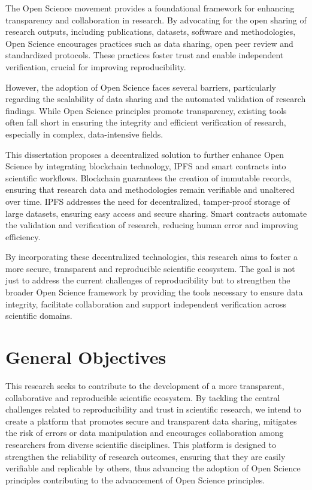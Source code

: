 \documentclass{article}
\begin{document}
The Open Science movement provides a foundational framework for enhancing transparency and collaboration in research. By advocating for the open sharing of research outputs, including publications, datasets, software and methodologies, Open Science encourages practices such as data sharing, open peer review and standardized protocols. These practices foster trust and enable independent verification, crucial for improving reproducibility.

However, the adoption of Open Science faces several barriers, particularly regarding the scalability of data sharing and the automated validation of research findings. While Open Science principles promote transparency, existing tools often fall short in ensuring the integrity and efficient verification of research, especially in complex, data-intensive fields.

This dissertation proposes a decentralized solution to further enhance Open Science by integrating blockchain technology, IPFS and smart contracts into scientific workflows. Blockchain guarantees the creation of immutable records, ensuring that research data and methodologies remain verifiable and unaltered over time. IPFS addresses the need for decentralized, tamper-proof storage of large datasets, ensuring easy access and secure sharing. Smart contracts automate the validation and verification of research, reducing human error and improving efficiency.

By incorporating these decentralized technologies, this research aims to foster a more secure, transparent and reproducible scientific ecosystem. The goal is not just to address the current challenges of reproducibility but to strengthen the broader Open Science framework by providing the tools necessary to ensure data integrity, facilitate collaboration and support independent verification across scientific domains.

\section{General Objectives}

This research seeks to contribute to the development of a more transparent, collaborative and reproducible scientific ecosystem. By tackling the central challenges related to reproducibility and trust in scientific research, we intend to create a platform that promotes secure and transparent data sharing, mitigates the risk of errors or data manipulation and encourages collaboration among researchers from diverse scientific disciplines. This platform is designed to strengthen the reliability of research outcomes, ensuring that they are easily verifiable and replicable by others, thus advancing the adoption of Open Science principles contributing to the advancement of Open Science principles.
\end{document}
